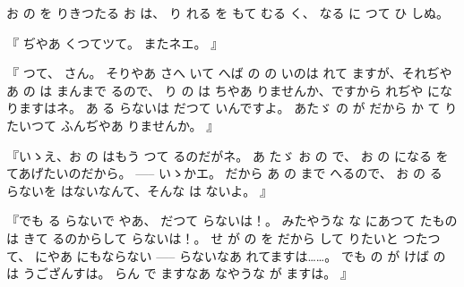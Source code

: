お
の
を
りきつたる
お
は、
り
れる
を
もて
むる
く、
なる
に
つて
ひ
しぬ。

『
ぢやあ
くつてツて。
またネエ。
』

『
つて、
さん。
そりやあ
さへ
いて
へば
の
の
いのは
れて
ますが、それぢやあ
の
は
まんまで
るので、
り
の
は
ちやあ
りませんか、ですから
れぢや
になりますはネ。
あ
る
らないは
だつて
いんですよ。
あたゞ
の
が
だから
か
て
りたいつて
ふんぢやあ
りませんか。
』

『いゝえ、お
の
はもう
つて
るのだがネ。
あ
たゞ
お
の
で、
お
の
になる
を
てあげたいのだから。
 \------ いゝかエ。
だから
あ
の
まで
へるので、
お
の
る
らないを
はないなんて、そんな
は
ないよ。
』

『でも
る
らないで
やあ、
だつて
らないは！。
みたやうな
な
にあつて
たものは
きて
るのからして
らないは！。
せ
が
の
を
だから
して
りたいと
つたつて、
にやあ
にもならない \------
らないなあ
れてますは……。
でも
の
が
けば
の
は
うござんすは。
らん
で
ますなあ
なやうな
が
ますは。
』

